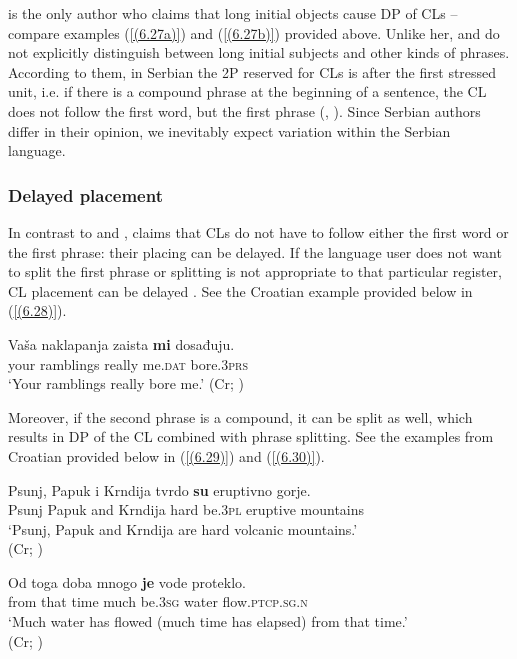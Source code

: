 \noindent \citet[][435]{RadanovicKocic96} is the only author who claims that long initial objects cause DP of CLs – compare examples (\ref{(6.27a)}) and (\ref{(6.27b)}) provided above. Unlike her, \citet[658]{MrazovicVukadinovic09} and \citet[450]{PiperKlajn14} do not explicitly distinguish between long initial subjects and other kinds of phrases. According to them, in Serbian the 2P reserved for CLs is after the first stressed unit, i.e. if there is a compound phrase at the beginning of a sentence, the CL does not follow the first word, but the first phrase (\citealt[658]{MrazovicVukadinovic09}, \citealt[450]{PiperKlajn14}). Since Serbian authors differ in their opinion, we inevitably expect variation within the Serbian language. 

\subsubsection{Delayed placement}

In contrast to \citet{MrazovicVukadinovic09} and \citet{PiperKlajn14}, \citet[48]{Alexander09} claims that CLs do not have to follow either the first word or the first phrase: their placing can be delayed. If the language user does not want to split the first phrase or splitting is not appropriate to that particular register, CL placement can be delayed \citep[cf.][48]{Alexander09}. See the Croatian example provided below in (\ref{(6.28)}).

\begin{exe}\ex\label{(6.28)}
\gll Vaša naklapanja zaista \textbf{mi} dosađuju. \\
 your ramblings really me\textsc{.dat} bore\textsc{.3prs} \\
\glt ‘Your ramblings really bore me.’ 
\hfill (Cr; \citealt[496]{Katicic86})
\end{exe}

\noindent Moreover, if the second phrase is a compound, it can be split as well, which results in DP of the CL combined with phrase splitting. See the examples from Croatian provided below in (\ref{(6.29)}) and (\ref{(6.30)}).  

\begin{exe}\ex\label{(6.29)}
\gll Psunj, Papuk i Krndija tvrdo \textbf{su} eruptivno gorje.\\
 Psunj Papuk and Krndija hard be\textsc{.3pl} eruptive mountains\\
\glt ‘Psunj, Papuk and Krndija are hard volcanic mountains.’  \\
\hfill  (Cr; \citealt[597]{Baric97})

\ex\label{(6.30)}
\gll Od toga doba mnogo \textbf{je} vode proteklo. \\
 from that time much be\textsc{.3sg} water flow\textsc{.ptcp.sg.n}\\
\glt ‘Much water has flowed (much time has elapsed) from that time.’  \\
\hfill  (Cr; \citealt[496]{Katicic86})
\end{exe}


